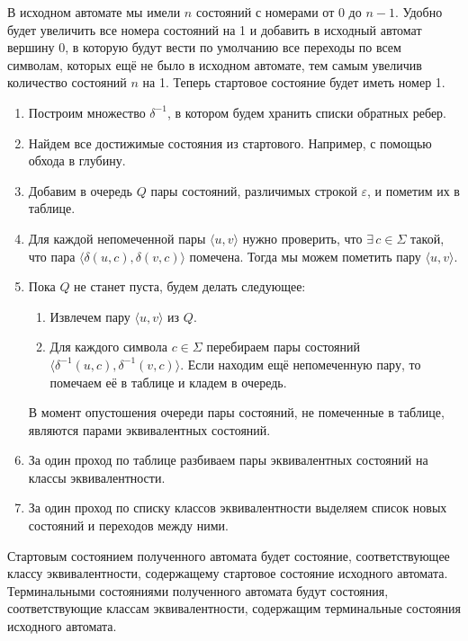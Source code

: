 \documentclass[a4paper,12pt]{article}
\begin{document}
	В исходном автомате мы имели \(n\) состояний с номерами от 0 до \(n - 1\). Удобно будет увеличить все номера состояний на 1 и добавить в исходный автомат вершину 0, в которую будут вести по умолчанию все переходы по всем символам, которых ещё не было в исходном автомате, тем самым увеличив количество состояний \(n\) на 1. Теперь стартовое состояние будет иметь номер 1.
	\begin{enumerate}
		\item Построим множество \(\delta^{-1}\), в котором будем хранить списки обратных ребер.
		
		\item Найдем все достижимые состояния из стартового. Например, с помощью обхода в глубину.
		
		\item Добавим в очередь \(Q\) пары состояний, различимых строкой \(\varepsilon\), и пометим их в таблице.
		
		\item Для каждой непомеченной пары \(\langle u, v \rangle\) нужно проверить, что \(\exists\,c \in \Sigma\) такой, что пара \(\langle \delta(u, c), \delta(v, c) \rangle\) помечена. Тогда мы можем пометить пару \(\langle u, v \rangle\).
		
		\item Пока \(Q\) не станет пуста, будем делать следующее:
		\begin{enumerate}
			\item Извлечем пару \(\langle u, v \rangle\) из \(Q\).
			
			\item Для каждого символа \(c \in \Sigma\) перебираем пары состояний \(\langle \delta^{-1}(u, c), \delta^{-1}(v,c) \rangle\). Если находим ещё непомеченную пару, то помечаем её в таблице и кладем в очередь.
		\end{enumerate}
		В момент опустошения очереди пары состояний, не помеченные в таблице, являются парами эквивалентных состояний.
		
		\item За один проход по таблице разбиваем пары эквивалентных состояний на классы эквивалентности.
	
		\item За один проход по списку классов эквивалентности выделяем список новых состояний и переходов между ними.
	\end{enumerate}

	Стартовым состоянием полученного автомата будет состояние, соответствующее классу эквивалентности, содержащему стартовое состояние исходного автомата.
	Терминальными состояниями полученного автомата будут состояния, соответствующие классам эквивалентности, содержащим терминальные состояния исходного автомата.
	
\end{document}
